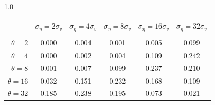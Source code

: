 \documentclass[12pt]{article}
\begin{document}
\begin{table}[h!]
\begin{subtable}{1.0\textwidth}
    \centering
\begin{tabular}{rccccc}
\hline  
            & \multicolumn{1}{l}{$\sigma_{\eta} =2\sigma_{v}$} & \multicolumn{1}{l}{$\sigma_{\eta} =4\sigma_{v}$} & \multicolumn{1}{l}{$\sigma_{\eta} =8\sigma_{v}$} & \multicolumn{1}{l}{$\sigma_{\eta} =16\sigma_{v}$} & \multicolumn{1}{l}{$\sigma_{\eta} =32\sigma_{v}$} \\ \hline  \vspace{-3mm} \\        
$\theta=2$  & 0.000                                             & 0.004                                             & 0.001                                             & 0.005                                              & 0.099                                              \\ \hline
$\theta=4$  & 0.000                                             & 0.002                                             & 0.004                                             & 0.109                                              & 0.242                                              \\ \hline
$\theta=8$  & 0.001                                             & 0.007                                             & 0.099                                             & 0.237                                              & 0.210                                              \\ \hline
$\theta=16$ & 0.032                                             & 0.151                                             & 0.232                                             & 0.168                                              & 0.109                                              \\ \hline
$\theta=32$ & 0.185                                             & 0.238                                             & 0.195                                             & 0.073                                              & 0.021                                              \\ \hline
\end{tabular}
\end{subtable}


\end{table}
\end{document}

